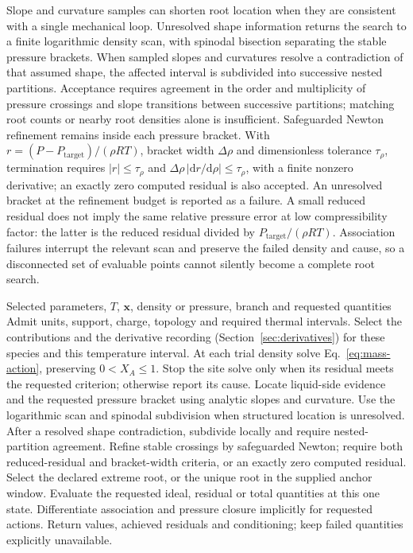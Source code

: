 Slope and curvature samples can shorten root location when they are consistent with a single mechanical loop.
Unresolved shape information returns the search to a finite logarithmic density scan, with spinodal bisection separating the stable pressure brackets.
When sampled slopes and curvatures resolve a contradiction of that assumed shape, the affected interval is subdivided into successive nested partitions.
Acceptance requires agreement in the order and multiplicity of pressure crossings and slope transitions between successive partitions; matching root counts or nearby root densities alone is insufficient.
Safeguarded Newton refinement remains inside each pressure bracket.
With $r=(P-P_{\mathrm{target}})/(\rho RT)$, bracket width $\Delta\rho$ and dimensionless tolerance $\tau_\rho$, termination requires $|r|\le\tau_\rho$ and $\Delta\rho\,|\mathrm{d}r/\mathrm{d}\rho|\le\tau_\rho$, with a finite nonzero derivative; an exactly zero computed residual is also accepted.
An unresolved bracket at the refinement budget is reported as a failure.
A small reduced residual does not imply the same relative pressure error at low compressibility factor: the latter is the reduced residual divided by $P_{\mathrm{target}}/(\rho RT)$.
Association failures interrupt the relevant scan and preserve the failed density and cause, so a disconnected set of evaluable points cannot silently become a complete root search.

\begin{algorithm}[tbp]
\caption{Evaluation of a density- or pressure-specified state}
\label{alg:state}
\begin{algorithmic}[1]
\Require Selected parameters, $T$, $\mathbf{x}$, density or pressure, branch and requested quantities
\State Admit units, support, charge, topology and required thermal intervals.
\State Select the contributions and the derivative recording (Section~\ref{sec:derivatives}) for these species and this temperature interval.
\State At each trial density solve Eq.~\eqref{eq:mass-action}, preserving $0<X_A\le1$.
\State Stop the site solve only when its residual meets the requested criterion; otherwise report its cause.
\State Locate liquid-side evidence and the requested pressure bracket using analytic slopes and curvature.
\State Use the logarithmic scan and spinodal subdivision when structured location is unresolved.
\State After a resolved shape contradiction, subdivide locally and require nested-partition agreement.
\State Refine stable crossings by safeguarded Newton; require both reduced-residual and bracket-width criteria, or an exactly zero computed residual.
\State Select the declared extreme root, or the unique root in the supplied anchor window.
\EndIf
\State Evaluate the requested ideal, residual or total quantities at this one state.
\State Differentiate association and pressure closure implicitly for requested actions.
\State Return values, achieved residuals and conditioning; keep failed quantities explicitly unavailable.
\end{algorithmic}
\end{algorithm}

